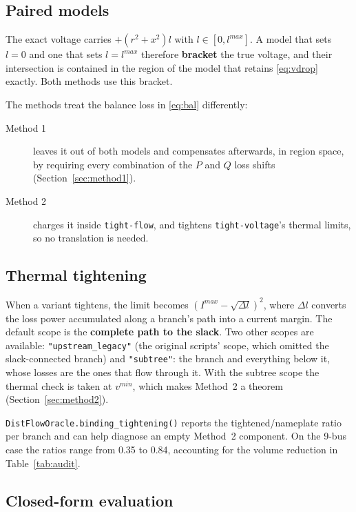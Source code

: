 \documentclass[11pt,a4paper]{report}
\newcommand{\code}[1]{\texttt{\small #1}}
\begin{document}
\subsection{Paired models}

The exact voltage carries $+(r^2+x^2)l$ with $l \in [0, l^{max}]$. A model that
sets $l = 0$ and one that sets $l = l^{max}$ therefore \textbf{bracket} the true
voltage, and their intersection is contained in the region of the model that
retains \eqref{eq:vdrop} exactly. Both methods use this bracket.

The methods treat the balance loss in \eqref{eq:bal} differently:

\begin{description}
\item[Method 1] leaves it out of both models and compensates afterwards, in
  region space, by requiring every combination of the $P$ and $Q$ loss shifts
  (Section~\ref{sec:method1}).
\item[Method 2] charges it inside \code{tight-flow}, and tightens
  \code{tight-voltage}'s thermal limits, so no translation is needed.
\end{description}

\subsection{Thermal tightening}

When a variant tightens, the limit becomes
$(I^{max} - \sqrt{\Delta l})^2$, where $\Delta l$ converts the loss power
accumulated along a branch's path into a current margin. The default scope is
the \textbf{complete path to the slack}. Two other scopes are available:
\code{"upstream\_legacy"} (the original scripts' scope, which omitted the
slack-connected branch) and \code{"subtree"}: the branch and everything below
it, whose losses are the ones that flow through it. With the subtree scope the
thermal check is taken at $v^{min}$, which makes Method~2 a theorem
(Section~\ref{sec:method2}).

\code{DistFlowOracle.binding\_tightening()} reports the tightened/nameplate
ratio per branch and can help diagnose an empty Method~2 component. On the
9-bus case the ratios range from 0.35 to 0.84, accounting for the volume
reduction in Table~\ref{tab:audit}.

\subsection{Closed-form evaluation}
\label{sec:closed-form}
\end{document}
